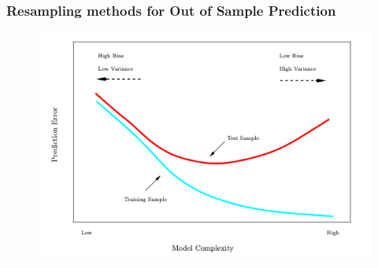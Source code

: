 \documentclass[
  shownotes,
  xcolor={svgnames},
  hyperref={colorlinks,citecolor=DarkBlue,linkcolor=andesred,urlcolor=DarkBlue}
  , aspectratio=169]{beamer}
\begin{document}
\begin{frame}
\frametitle{Resampling methods for Out of Sample Prediction}

\begin{figure}[H]\centering
           \captionsetup{justification=centering}  
        \includegraphics[scale=.6]{figures/train_test_error.png}
    \end{figure}

\end{frame}
\end{document}
